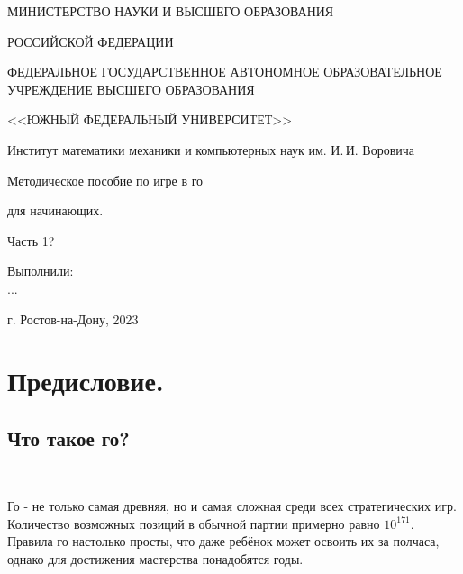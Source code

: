 \documentclass[14pt,a4paper]{extarticle}
\begin{document}
\thispagestyle{empty}
\begin{center}
\small{МИНИСТЕРСТВО НАУКИ И ВЫСШЕГО ОБРАЗОВАНИЯ}\par
\small{РОССИЙСКОЙ ФЕДЕРАЦИИ}\par
\small{ФЕДЕРАЛЬНОЕ ГОСУДАРСТВЕННОЕ АВТОНОМНОЕ ОБРАЗОВАТЕЛЬНОЕ УЧРЕЖДЕНИЕ ВЫСШЕГО ОБРАЗОВАНИЯ}\par
\small{<<ЮЖНЫЙ ФЕДЕРАЛЬНЫЙ УНИВЕРСИТЕТ>>}\par
\normalsize{Институт математики механики и компьютерных наук им. И.\,И. Воровича}\par
\end{center}


\vspace*{5.0em plus 0.2em minus 0.2em}

\begin{center}
Методическое пособие по игре в го
\end{center}

\begin{center}
для начинающих.
\end{center}

\begin{center}
Часть 1?
\end{center}

\vspace*{5.0em plus 0.2em minus 0.2em}
\begin{flushright}
 Выполнили:\\
	...
\end{flushright}






\vspace*{\fill}

\begin{center}
г. Ростов-на-Дону, 2023
\end{center}


\newpage

\section*{Предисловие.}

\subsection*{Что такое го?}
\

Го - не только самая древняя, но и самая сложная среди всех стратегических игр. Количество возможных позиций в обычной партии примерно равно $10^{171}$. Правила го настолько просты, что даже ребёнок может освоить их за полчаса, однако для достижения мастерства понадобятся годы. 
\end{document}

